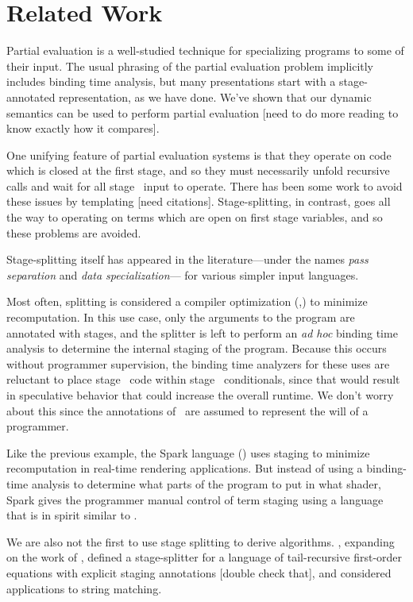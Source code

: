 
\section{Related Work}

Partial evaluation is a well-studied technique for specializing programs to some of their input.  
The usual phrasing of the partial evaluation problem implicitly includes binding time analysis,
but many presentations start with a stage-annotated representation, as we have done.
We've shown that our dynamic semantics can be used to perform partial evaluation 
[need to do more reading to know exactly how it compares].

One unifying feature of partial evaluation systems is that they operate on code which is closed at the first stage,
and so they must necessarily unfold recursive calls and wait for all stage \bbone\ input to operate.
There has been some work to avoid these issues by templating [need citations].
Stage-splitting, in contrast, goes all the way to operating on terms which are open on first stage variables,
and so these problems are avoided.


Stage-splitting itself has appeared in the literature---under 
the names {\em pass separation} and {\em data specialization}--- for various simpler input languages.

Most often, splitting is considered a compiler optimization (\cite{jorring86},\cite{knoblock96})
to minimize recomputation.
In this use case, only the arguments to the program are annotated with stages, 
and the splitter is left to perform an {\em ad hoc} binding time analysis to determine the 
internal staging of the program.
Because this occurs without programmer supervision, the binding time analyzers for these uses are 
reluctant to place stage \bbone\ code within stage \bbtwo\ conditionals, 
since that would result in speculative behavior that could increase the overall runtime.
We don't worry about this since the annotations of \lang\ are assumed to represent the will of a programmer.

Like the previous example, the Spark language (\cite{sparkThesis}) uses staging to minimize recomputation in real-time rendering applications.  
But instead of using a binding-time analysis to determine what parts of the program to put in what shader, 
Spark gives the programmer manual control of term staging using a language that is in spirit similar to \lang. 

We are also not the first to use stage splitting to derive algorithms.
\cite{malmkjaer89}, expanding on the work of \cite{barzdins88}, defined a stage-splitter
for a language of tail-recursive first-order equations with explicit staging annotations [double check that],
and considered applications to string matching.

